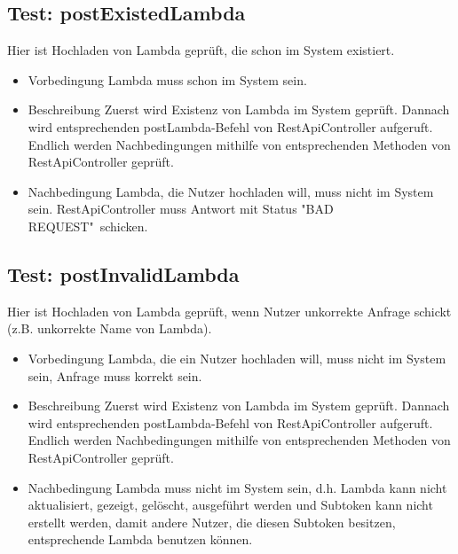 \documentclass[a4paper,20pt,oneside]{book}
\begin{document}
\subsection{Test: postExistedLambda}
Hier ist Hochladen von Lambda geprüft, die schon im System existiert.
\begin{itemize}
	\item Vorbedingung \linebreak
	Lambda muss schon im System sein.
	\item Beschreibung
	Zuerst wird Existenz von Lambda im System geprüft. Dannach wird entsprechenden postLambda-Befehl von RestApiController aufgeruft. Endlich werden Nachbedingungen mithilfe von  entsprechenden Methoden von RestApiController geprüft.
	\item Nachbedingung
	Lambda, die Nutzer hochladen will, muss nicht im System sein. RestApiController muss Antwort mit Status "BAD REQUEST"\ schicken.
\end{itemize}
\subsection{Test: postInvalidLambda}
Hier ist Hochladen von Lambda geprüft, wenn Nutzer unkorrekte Anfrage schickt (z.B. unkorrekte Name von Lambda).
\begin{itemize}
	\item Vorbedingung \linebreak
	Lambda, die ein Nutzer hochladen will, muss nicht im System sein, Anfrage muss korrekt sein.
	\item Beschreibung \linebreak
	Zuerst wird Existenz von Lambda im System geprüft. Dannach wird entsprechenden postLambda-Befehl von RestApiController aufgeruft. Endlich werden Nachbedingungen mithilfe von  entsprechenden Methoden von RestApiController geprüft.
	\item Nachbedingung \linebreak
	Lambda muss nicht im System sein, d.h. Lambda kann nicht aktualisiert, gezeigt, gelöscht, ausgeführt werden und Subtoken kann nicht erstellt werden, damit andere Nutzer, die diesen Subtoken besitzen, entsprechende Lambda benutzen können.
\end{itemize}
\end{document}
